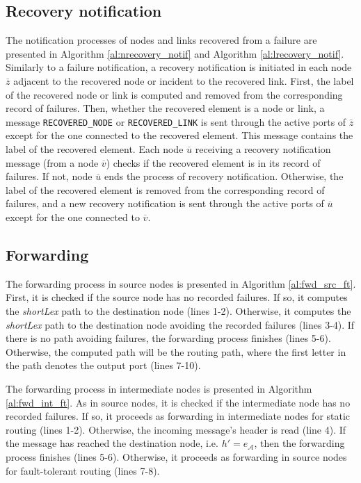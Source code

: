 

\subsection{Recovery notification}





The notification processes of nodes and links recovered from a failure are presented in Algorithm \ref{al:nrecovery_notif} and Algorithm \ref{al:lrecovery_notif}. Similarly to a failure notification, a recovery notification is initiated in each node $\overline{z}$ adjacent to the recovered node or incident to the recovered link. First, the label of the recovered node or link is computed and removed from the corresponding record of failures. Then, whether the recovered element is a node or link, a message \texttt{RECOVERED\_NODE} or \texttt{RECOVERED\_LINK} is sent through the active ports of $\overline{z}$ except for the one connected to the recovered element. This
message contains the label of the recovered element.
Each node $\overline{u}$ receiving a recovery notification message (from a node $\overline{v}$) checks if the recovered element is in its record of failures. If not, node $\overline{u}$ ends the process of recovery notification. Otherwise, the label of the recovered element is removed from the corresponding record of failures, and a new recovery notification is sent through the active ports of $\overline{u}$ except for the one connected to $\overline{v}$.

\subsection{Forwarding}

The forwarding process in source nodes is presented in Algorithm \ref{al:fwd_src_ft}. First, it is checked if the source node has no recorded failures. If so, it computes the \textit{shortLex} path to the destination node (lines 1-2). Otherwise, it computes the \textit{shortLex} path to the destination node avoiding the recorded failures (lines 3-4). If there is no path avoiding failures, the forwarding process finishes (lines 5-6). Otherwise, the computed path will be the routing path, where the first letter in the path denotes the output port (lines 7-10). 



The forwarding process in intermediate nodes is presented in Algorithm \ref{al:fwd_int_ft}. As in source nodes, it is checked if the intermediate node has no recorded failures. If so, it proceeds as forwarding in intermediate nodes for static routing (lines 1-2). Otherwise, the incoming message's header is read (line 4). If the message has reached the destination node, i.e. $h'=e_\mathcal{A}$, then the forwarding process finishes (lines 5-6). Otherwise, it proceeds as forwarding in source nodes for fault-tolerant routing (lines 7-8). 

